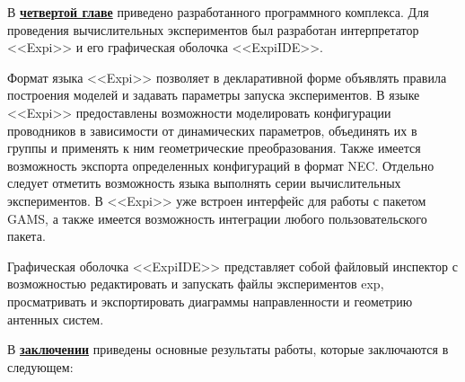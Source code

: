 В \underline{\textbf{четвертой главе}} приведено разработанного программного комплекса. Для проведения вычислительных экспериментов был разработан интерпретатор <<Expi>> и его графическая оболочка <<ExpiIDE>>.

Формат языка <<Expi>> позволяет в декларативной форме объявлять правила построения моделей и задавать параметры запуска экспериментов.
В языке <<Expi>> предоставлены возможности моделировать конфигурации проводников в зависимости от динамических параметров, объединять их в группы и применять к ним геометрические преобразования. Также имеется возможность экспорта определенных конфигураций в формат NEC. Отдельно следует отметить возможность языка выполнять серии вычислительных экспериментов. В <<Expi>> уже встроен интерфейс для работы с пакетом GAMS, а также имеется возможность интеграции любого пользовательского пакета.

Графическая оболочка <<ExpiIDE>> представляет собой файловый инспектор с возможностью редактировать и запускать файлы экспериментов exp, просматривать и экспортировать диаграммы направленности и геометрию антенных систем.

\FloatBarrier
{}                                  %
В \underline{\textbf{заключении}} приведены основные результаты работы, которые заключаются в следующем:



